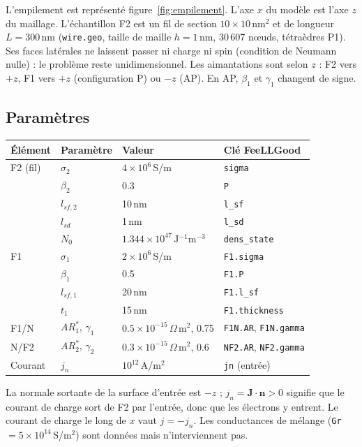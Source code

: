 \documentclass[11pt,a4paper]{article}
\begin{document}
L'empilement est représenté figure~\ref{fig:empilement}. L'axe $x$ du
modèle est l'axe $z$ du maillage. L'échantillon F2 est un fil de section
$10\times10$\,nm$^2$ et de longueur $L = 300$\,nm (\texttt{wire.geo},
taille de maille $h = 1$\,nm, 30\,607 nœuds, tétraèdres P1). Ses faces
latérales ne laissent passer ni charge ni spin (condition de Neumann
nulle) : le problème reste unidimensionnel. Les aimantations sont selon
$z$ : F2 vers $+z$, F1 vers $+z$ (configuration P) ou $-z$ (AP). En AP,
$\beta_1$ et $\gamma_1$ changent de signe.

\subsection{Paramètres}

\begin{center}
\renewcommand{\arraystretch}{1.2}
\begin{tabular}{llll}
  \toprule
  Élément & Paramètre & Valeur & Clé FeeLLGood \\
  \midrule
  F2 (fil) & $\sigma_2$ & $4\times10^6$\,S/m & \texttt{sigma} \\
    & $\beta_2$ & 0.3 & \texttt{P} \\
    & $l_{sf,2}$ & 10\,nm & \texttt{l\_sf} \\
    & $l_{sd}$ & 1\,nm & \texttt{l\_sd} \\
    & $N_0$ & $1.344\times10^{47}$\,J$^{-1}$m$^{-3}$ & \texttt{dens\_state} \\
  F1 & $\sigma_1$ & $2\times10^6$\,S/m & \texttt{F1.sigma} \\
    & $\beta_1$ & 0.5 & \texttt{F1.P} \\
    & $l_{sf,1}$ & 20\,nm & \texttt{F1.l\_sf} \\
    & $t_1$ & 15\,nm & \texttt{F1.thickness} \\
  F1/N & $AR_1^*$, $\gamma_1$ & $0.5\times10^{-15}\,\Omega\,$m$^2$, 0.75
    & \texttt{F1N.AR}, \texttt{F1N.gamma} \\
  N/F2 & $AR_2^*$, $\gamma_2$ & $0.3\times10^{-15}\,\Omega\,$m$^2$, 0.6
    & \texttt{NF2.AR}, \texttt{NF2.gamma} \\
  Courant & $j_n$ & $10^{12}$\,A/m$^2$ & \texttt{jn} (entrée) \\
  \bottomrule
\end{tabular}
\end{center}

La normale sortante de la surface d'entrée est $-z$ ; $j_n = \bm{J}\cdot
\bm{n} > 0$ signifie que le courant de charge sort de F2 par l'entrée,
donc que les électrons y entrent. Le courant de charge le long de $x$ vaut
$j = -j_n$. Les conductances de mélange (\texttt{Gr} $= 5\times10^{14}$\,S/m$^2$)
sont données mais n'interviennent pas.
\end{document}
